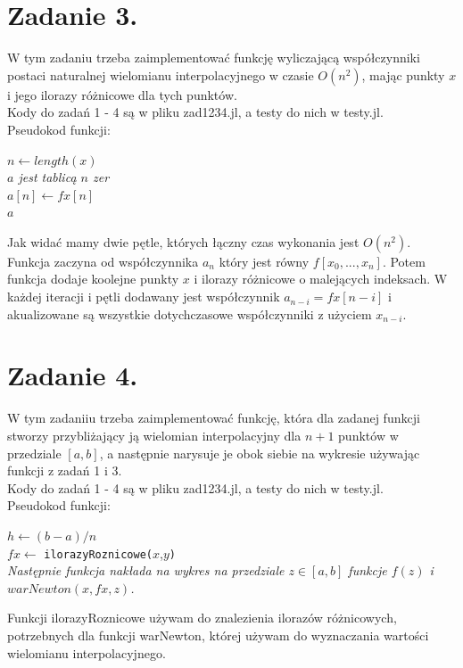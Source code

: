 \documentclass{article}
\begin{document}
\section{Zadanie 3.}
W tym zadaniu trzeba zaimplementować funkcję wyliczającą współczynniki postaci naturalnej wielomianu interpolacyjnego w czasie $O(n^2)$, mając punkty $x$ i jego ilorazy różnicowe dla tych punktów.\\
Kody do zadań 1 - 4 są w pliku zad1234.jl, a testy do nich w testy.jl.\\
Pseudokod funkcji:\\
\begin{algorithm}[H]
$n \leftarrow length(x)$\\
\emph{$a$ jest tablicą $n$ zer}\\
$a[n] \leftarrow fx[n]$\\
\KwRet $a$
\end{algorithm}
Jak widać mamy dwie pętle, których łączny czas wykonania jest $O(n^2)$. Funkcja zaczyna od współczynnika $a_n$ który jest równy $f[x_0,...,x_n]$. Potem funkcja dodaje koolejne punkty $x$ i ilorazy różnicowe o malejących indeksach. W każdej iteracji i pętli dodawany jest współczynnik $a_{n-i}=fx[n-i]$ i akualizowane są wszystkie dotychczasowe współczynniki z użyciem $x_{n-i}$.
\section{Zadanie 4.}
W tym zadaniiu trzeba zaimplementować funkcję, która dla zadanej funkcji stworzy przybliżający ją wielomian interpolacyjny dla $n+1$ punktów w przedziale $[a,b]$, a następnie narysuje je obok siebie na wykresie używając funkcji z zadań 1 i 3.\\
Kody do zadań 1 - 4 są w pliku zad1234.jl, a testy do nich w testy.jl.\\
Pseudokod funkcji:\\
\begin{algorithm}[H]
$h \leftarrow (b-a)/n$\\
$fx \leftarrow$ \verb|ilorazyRoznicowe(|$x$,$y$\verb|)|\\
\emph{Następnie funkcja nakłada na wykres na przedziale $z\in[a,b]$ funkcje $f(z)$ i $warNewton(x,fx,z)$.}
\end{algorithm}
Funkcji ilorazyRoznicowe używam do znalezienia ilorazów różnicowych, potrzebnych dla funkcji warNewton, której używam do wyznaczania wartości wielomianu interpolacyjnego.
\end{document}
